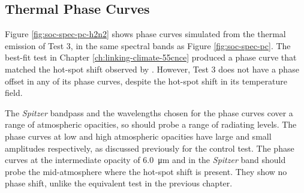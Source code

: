 




\subsection{Thermal Phase Curves}

Figure \ref{fig:soc-spec-pc-h2n2} shows phase curves simulated from the thermal emission of Test 3, in the same spectral bands as Figure \ref{fig:soc-spec-pc}. The best-fit test in Chapter \ref{ch:linking-climate-55cnce} produced a phase curve that matched the hot-spot shift observed by \citet{demory201655cnce}. However, Test 3 does not have a phase offset in any of its phase curves, despite the hot-spot shift in its temperature field.

The \textit{Spitzer} bandpass and the wavelengths chosen for the phase curves cover a range of atmospheric opacities, so should probe a range of radiating levels. The phase curves at low and high atmospheric opacities have large and small amplitudes respectively, as discussed previously for the control test. The phase curves at the intermediate opacity of \SI{6.0}{\micro\metre} and in the \textit{Spitzer} band should probe the mid-atmosphere where the hot-spot shift is present. They show no phase shift, unlike the equivalent test in the previous chapter.


%


